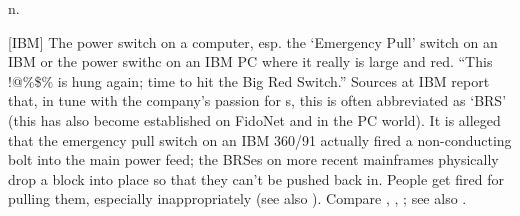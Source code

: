  n.

[IBM] The power switch on a computer, esp. the `Emergency Pull' switch
on an IBM  or the power swithc on an IBM PC where
it really is large and red. ``This !@\%\$\%  is
hung again; time to hit the Big Red Switch.'' Sources at IBM report
that, in tune with the company's passion for s, this is
often abbreviated as `BRS' (this has also become established on FidoNet
and in the PC  world). It is alleged that the emergency
pull switch on an IBM 360/91 actually fired a non-conducting bolt into
the main power feed; the BRSes on more recent mainframes physically drop
a block into place so that they can't be pushed back in. People get
fired for pulling them, especially inappropriately (see also
). Compare ,
, ; see also
.

